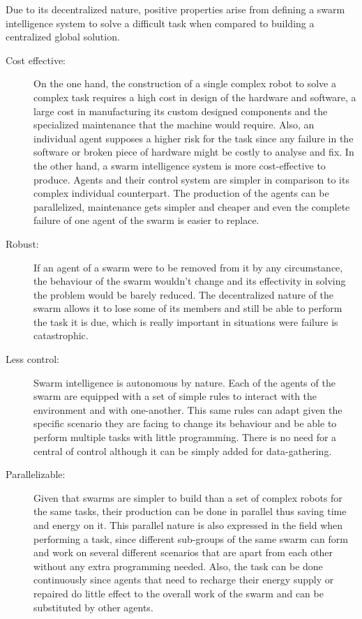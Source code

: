 Due to its decentralized nature, positive properties arise from defining a swarm intelligence system to solve a difficult task when compared to building a centralized global solution.

\begin{description}
\item[Cost effective:] On the one hand, the construction of a single complex robot to solve a complex task requires a high cost in design of the hardware and software, a large cost in manufacturing its custom designed components and the specialized maintenance that the machine would require. Also, an individual agent supposes a higher risk for the task since any failure in the software or broken piece of hardware might be costly to analyse and fix. In the other hand, a swarm intelligence system is more cost-effective to produce.  Agents and their control system are simpler in comparison to its complex individual counterpart. The production of the agents can be parallelized, maintenance gets simpler and cheaper and even the complete failure of one agent of the swarm is easier to replace.

\item[Robust:] If an agent of a swarm were to be removed from it by any circumstance, the behaviour of the swarm wouldn't change and its effectivity in solving the problem would be barely reduced. The decentralized nature of the swarm allows it to lose some of its members and still be able to perform the task it is due, which is really important in situations were failure is catastrophic.

\item[Less control:] Swarm intelligence is autonomous by nature. Each of the agents of the swarm are equipped with a set of simple rules to interact with the environment and with one-another. This same rules can adapt given the specific scenario they are facing to change its behaviour and be able to perform multiple tasks with little programming. There is no need for a central of control although it can be simply added for data-gathering.

\item[Parallelizable:] Given that swarms are simpler to build than a set of complex robots for the same tasks, their production can be done in parallel thus saving time and energy on it. This parallel nature is also expressed in the field when performing a task, since different sub-groups of the same swarm can form and work on several different scenarios that are apart from each other without any extra programming needed. Also, the task can be done continuously since agents that need to recharge their energy supply or repaired do little effect to the overall work of the swarm and can be substituted by other agents.
\end{description}

